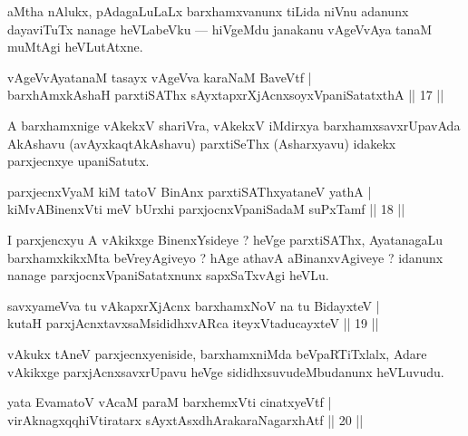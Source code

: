 \begin{artha}
aMtha nAlukx, pAdagaLuLaLx barxhamxvanunx tiLida niVnu adanunx dayaviTuTx nanage heVLabeVku --- hiVgeMdu janakanu vAgeVvAya tanaM muMtAgi heVLutAtxne.
\end{artha}

\begin{shl}
vAgeVvA\s \s yatanaM tasayx vAgeVva karaNaM BaveVtf |\\
barxhAmx\s \s kAshaH parxtiSAThx sAyxtapxrXjAcnx\s soyxVpaniSatatxthA \hfill || 17 || 
\end{shl}

\begin{artha}
A barxhamxnige vAkekxV shariVra, vAkekxV iMdirxya barxhamxsavxrUpavAda AkAshavu (avAyxkaqtAkAshavu) parxtiSeThx (Asharxyavu) idakekx parxjecnxye upaniSatutx.
\end{artha}


\begin{shl}
parxjecnxVyaM kiM tatoV BinAnx parxtiSAThxyataneV yathA |\\
kiMvA\s BinenxVti meV bUrxhi parxjocnxVpaniSadaM suPxTamf \hfill || 18 || 
\end{shl}

\begin{artha}
I parxjencxyu A vAkikxge BinenxYsideye ? heVge parxtiSAThx, AyatanagaLu barxhamxkikxMta beVreyAgiveyo ? hAge athavA aBinanxvAgiveye ? idanunx nanage parxjocnxVpaniSatatxnunx sapxSaTxvAgi heVLu.
\end{artha}


\begin{shl}
savxyameVva tu vAkapxrXjAcnx barxhamxNoV na tu BidayxteV |\\
kutaH parxjAcnxtavxsaMsididhxvARca iteyxVtaducayxteV \hfill || 19 || 
\end{shl}

\begin{artha}
vAkukx tAneV parxjecnxyeniside, barxhamxniMda beVpaRTiTxlalx, Adare vAkikxge parxjAcnxsavxrUpavu heVge sididhxsuvudeMbudanunx heVLuvudu.
\end{artha}


\begin{shl}
yata EvamatoV vAcaM paraM barxhemxVti cinatxyeVtf |\\
virAknagxqqhiVtiratarx sAyxtAsxdhArakaraNagarxhAtf \hfill || 20 || 
\end{shl}

